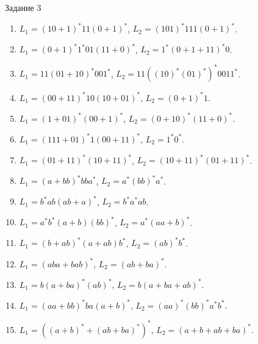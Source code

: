 Задание 3
\begin{enumerate}
\item $L_1 = (10+1)^\ast11(0+1)^\ast$, $L_2 = (101)^\ast111(0+1)^\ast$.
\item $L_1 = (0+1)^\ast1^\ast01(11+0)^\ast$, $L_2 = 1^\ast(0+1+11)^\ast0$.
\item $L_1 = 11(01+10)^\ast001^\ast$, $L_2 = 11((10)^\ast(01)^\ast)^\ast0011^\ast$.
\item $L_1 = (00+11)^\ast10(10+01)^\ast$, $L_2 = (0+1)^\ast1$.
\item $L_1 = (1+01)^\ast(00+1)^\ast$, $L_2 = (0+10)^\ast(11+0)^\ast$.
\item $L_1 = (111+01)^\ast1(00+11)^\ast$, $L_2 = 1^\ast0^\ast$.
\item $L_1 = (01+11)^\ast(10+11)^\ast$, $L_2 = (10+11)^\ast(01+11)^\ast$.
\item $L_1 = (a+bb)^\ast bba^\ast$, $L_2 = a^\ast (bb)^\ast a^\ast$.
\item $L_1 = b^\ast ab(ab+a)^\ast$, $L_2 = b^\ast a^\ast ab$.
\item $L_1 = a^\ast b^\ast(a+b)(bb)^\ast$, $L_2 = a^\ast(aa+b)^\ast$.
\item $L_1 = (b+ab)^\ast(a+ab)b^\ast$, $L_2 = (ab)^\ast b^\ast$.
\item $L_1 = (aba+bab)^\ast$, $L_2 = (ab + ba)^\ast$.
\item $L_1 = b(a+ba)^\ast (ab)^\ast$, $L_2 = b(a+ba+ab)^\ast$.
\item $L_1 = (aa+bb)^\ast ba(a+b)^\ast$, $L_2 = (aa)^\ast(bb)^\ast a^\ast b^\ast$.
\item $L_1 = ((a+b)^\ast + (ab+ba)^\ast)^\ast$, $L_2 = (a+b+ab+ba)^\ast$.


\end{enumerate}
